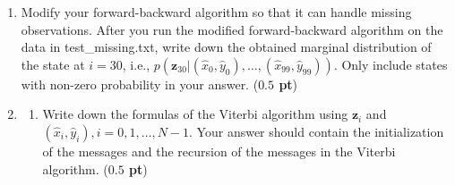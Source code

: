 \documentclass[twoside]{article}
\begin{document}
\begin{enumerate}
\begin{enumerate}
      \begin{center}
   \end{center}
\end{enumerate}

\item Modify your forward-backward algorithm so that it can handle missing observations. After you run the modified forward-backward algorithm on the data in \textsf{test\_missing.txt}, write down the obtained marginal distribution of the state at $i=30$, i.e., $p(\mathbf{z}_{30}|(\hat{x}_0,\hat{y}_0),\ldots,(\hat{x}_{99},\hat{y}_{99}))$. Only include states with non-zero probability in your answer. ({\bf $0.5$ pt})
    \begin{center}
   \end{center}

\item
\begin{enumerate}
\item Write down the formulas of the Viterbi algorithm using $\mathbf{z}_i$ and $(\hat{x}_i,\hat{y}_i), i=0,1,\ldots,N-1$. Your answer should contain the initialization of the messages and the recursion of the messages in the Viterbi algorithm. ({\bf $0.5$ pt})
    \begin{center}
\end{center}
\end{enumerate}
\end{enumerate}
\end{document}
